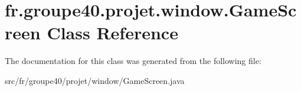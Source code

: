 \hypertarget{classfr_1_1groupe40_1_1projet_1_1window_1_1_game_screen}{}\section{fr.\+groupe40.\+projet.\+window.\+Game\+Screen Class Reference}
\label{classfr_1_1groupe40_1_1projet_1_1window_1_1_game_screen}


The documentation for this class was generated from the following file\+:\begin{DoxyCompactItemize}
\item 
src/fr/groupe40/projet/window/Game\+Screen.\+java\end{DoxyCompactItemize}
